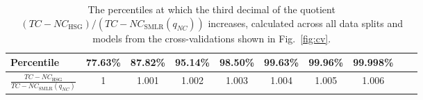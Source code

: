 \documentclass[preprint,5p,times,11pt]{elsarticle}
\begin{document}
\begin{table*}
\centering
\caption{
The percentiles at which the third decimal of the quotient $\left(TC - NC_{\text{HSG}}\right) / \left(TC - NC_{\text{SMLR}}(q_{NC})\right)$ increases, calculated across all data splits and models from the cross-validations shown in Fig.~\ref{fig:cv}.
}
\label{tab:AC_prop}
\vspace{1mm}
\begin{tabular}{l*{9}{c}}
Percentile             & 77.63\% & 87.82\% & 95.14\% & 98.50\% & 99.63\% & 99.96\% & 99.998\% \\
\hline
$\frac{TC - NC_{\text{HSG}}}{TC - NC_{\text{SMLR}}(q_{NC})}$ & 1 & 1.001 & 1.002 & 1.003 & 1.004 & 1.005 & 1.006 \\
\end{tabular}
\end{table*}


\newpage
\end{document}
